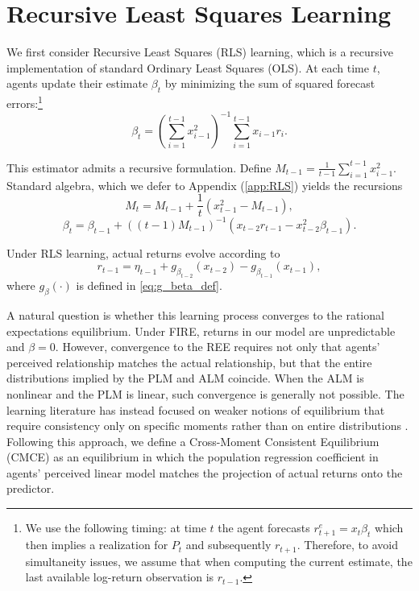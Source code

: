 \section{Recursive Least Squares Learning}\label{sec:rec_ls}

We first consider Recursive Least Squares (RLS) learning, which is a recursive implementation of standard Ordinary Least Squares (OLS). At each time $t$, agents update their estimate $\beta_t$ by minimizing the sum of squared forecast errors:\footnote{We use the following timing: at time $t$ the agent forecasts $r^e_{t+1} = x_t \beta_t$ which then implies a realization for $P_t$ and subsequently $r_{t+1}$. Therefore, to avoid simultaneity issues, we assume that when computing the current estimate, the last available log-return observation is $r_{t-1}$.}
\begin{equation}
    \beta_t = \left(\sum^{t-1}_{i=1} x_{i-1}^2 \right)^{-1} \sum^{t-1}_{i=1} x_{i-1} r_i.
\end{equation}

This estimator admits a recursive formulation. Define $M_{t-1} = \frac{1}{t-1} \sum^{t-1}_{i=1} x_{i-1}^2$. Standard algebra, which we defer to Appendix (\ref{app:RLS}) yields the recursions
\begin{equation}
    M_t = M_{t-1} + \frac{1}{t} \left(x_{t-1}^2 - M_{t-1} \right),
\end{equation}
\begin{equation}
    \beta_t = \beta_{t-1} + \left((t-1) M_{t-1} \right)^{-1} \left( x_{t-2} r_{t-1} - x_{t-2}^2 \beta_{t-1} \right).
\end{equation}

Under RLS learning, actual returns evolve according to
\begin{equation}\label{eq:alm_RLS}
    r_{t-1} = \eta_{t-1}
    + g_{\beta_{t-2}}(x_{t-2}) - g_{\beta_{t-1}}(x_{t-1}),
\end{equation}
where $g_\beta(\cdot)$ is defined in \eqref{eq:g_beta_def}.

A natural question is whether this learning process converges to the rational expectations equilibrium. 
Under FIRE, returns in our model are unpredictable and $\beta = 0$. 
However, convergence to the REE requires not only that agents' perceived relationship matches the actual relationship, but that the entire distributions implied by the PLM and ALM coincide. 
When the ALM is nonlinear and the PLM is linear, such convergence is generally not possible. 
The learning literature has instead focused on weaker notions of equilibrium that require consistency only on specific moments rather than on entire distributions \citep{Hommes2014}. 
Following this approach, we define a Cross-Moment Consistent Equilibrium (CMCE) as an equilibrium in which the population regression coefficient in agents' perceived linear model matches the projection of actual returns onto the predictor.


